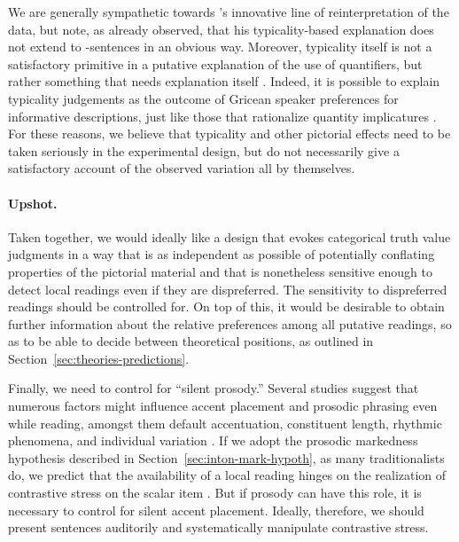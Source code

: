 \documentclass[fleqn,reqno,10pt]{article}
\renewcommand{\es}{\acro{es}}
\begin{document}
We are generally sympathetic towards
\citeauthor{Tielvan-Tiel2012:Embedded-Scalar}'s innovative line of
reinterpretation of the data, but note, as
\citet{ChemlaSpector2010:Experimental-Ev} already observed, that his
typicality-based explanation does not extend to \es-sentences in an
obvious way. Moreover, typicality itself is not a satisfactory
primitive in a putative explanation of the use of quantifiers, but
rather something that needs explanation itself \citep[c.f.][for
critical reflection on typicality-based
explanations]{Cummins2014:Typicality-made}. Indeed, it is possible to
explain typicality judgements as the outcome of Gricean speaker
preferences for informative descriptions, just like those that
rationalize quantity implicatures \citep{Franke2014:Typical-use-of-}.
For these reasons, we believe that typicality and other pictorial
effects need to be taken seriously in the experimental design, but do
not necessarily give a satisfactory account of the observed variation
all by themselves.

\paragraph{Upshot.} Taken together, we would ideally like a design
that evokes categorical truth value judgments in a way that is as
independent as possible of potentially conflating properties of the
pictorial material and that is nonetheless sensitive enough to detect
local readings even if they are dispreferred. The sensitivity to
dispreferred readings should be controlled for. On top of this, it
would be desirable to obtain further information about the relative
preferences among all putative readings, so as to be able to decide
between theoretical positions, as outlined in
Section~\ref{sec:theories-predictions}. %

Finally, we need to control for ``silent prosody.'' Several studies
suggest that numerous factors might influence accent placement and
prosodic phrasing even while reading, amongst them default
accentuation, constituent length, rhythmic phenomena, and individual
variation
\citep[e.g.][]{Bader98,Fodor98,Steinhauer01,Fodor02,Augurzky08,BreenWatson2011:Intonational-ph,Kentner12}. If
we adopt the prosodic markedness hypothesis described in
Section~\ref{sec:inton-mark-hypoth}, as many traditionalists do, we
predict that the availability of a local reading hinges on the
realization of contrastive stress on the scalar item
\citep[e.g.][]{Horn2006:The-Border-Wars,Geurts2009:Scalar-Implicat,Geurts2010:Quantity-Implic,Tielvan-Tiel2012:Embedded-Scalar,GeurtsTielvan-Tiel2013:Embedded-Scalar}.
But if prosody can have this role, it is necessary to control for
silent accent placement. Ideally, therefore, we should present
sentences auditorily and systematically manipulate contrastive stress.
\end{document}
